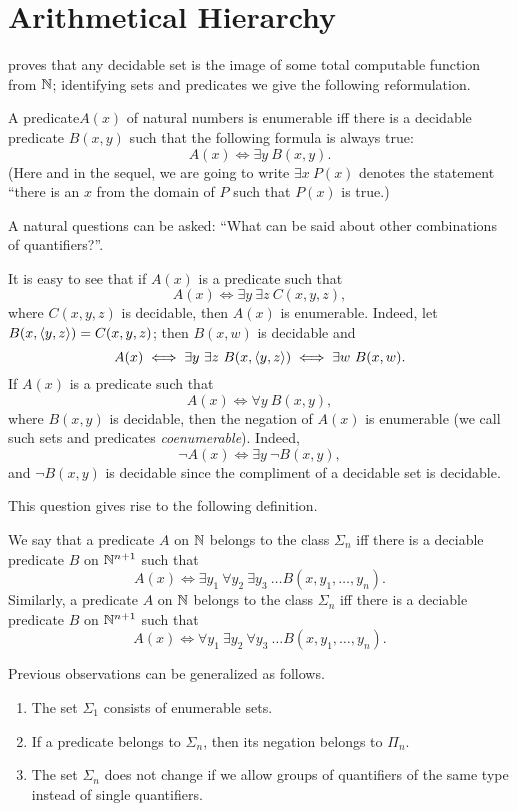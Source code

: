 \chapter{Arithmetical Hierarchy}

 proves that any decidable set
is the image of some total computable function from ${\mathbb{N}}$; identifying sets and
predicates we give the following reformulation.
\begin{theorem}
  A predicate$A(x)$ of natural numbers is enumerable iff there is a decidable
  predicate $B(x, y)$ such that the following formula is always true:
  \[
    A(x) \iff \exists y \  B(x, y).
  \]
  (Here and in the sequel, we are going to write $\exists x \  P(x)$ denotes the
  statement ``there is an $x$ from the domain of $P$ such that $P(x)$ is true.)
\end{theorem}

A natural questions can be asked: ``What can be said about other combinations of
quantifiers?''.

It is easy to see that if $A(x)$ is a predicate such that 
\[
  A(x) \iff \exists y \  \exists z \  C(x, y, z),
\]
where $C(x, y, z)$ is decidable, then $A(x)$ is enumerable.
Indeed, let $B(x, \langle {y}, {z} \rangle) = C(x, y, z)$; then $B(x, w)$ is decidable and 
\[
  A(x) \iff \exists y \  \exists z \  B(x, \langle {y}, {z} \rangle) \iff 
    \exists w \  B(x, w).
\]
If $A(x)$ is a predicate such that 
\[
  A(x) \iff \forall y \  B(x, y),
\]
where $B(x, y)$ is decidable, then the negation of $A(x)$ is enumerable (we call
such sets and predicates \emph{coenumerable}). Indeed, 
\[
  \lnot A(x) \iff \exists y \  \lnot B(x, y),
\]
and $\lnot B(x, y)$ is decidable since the compliment of a decidable set is
decidable.

This question gives rise to the following definition.
\begin{definition}
  We say that a predicate $A$ on ${\mathbb{N}}$ belongs to the class $\Sigma_n$ iff there
  is a deciable predicate $B$ on ${\mathbb{N}}^{n + 1}$ such that 
  \[
    A(x) \iff 
    \exists y_1 \  \forall y_2 \  \exists y_3 \  \dots B(x, y_1, \dots, y_n).
  \]
  Similarly, a predicate $A$ on ${\mathbb{N}}$ belongs to the class $\Sigma_n$ iff there
  is a deciable predicate $B$ on ${\mathbb{N}}^{n + 1}$ such that 
  \[
    A(x) \iff 
    \forall y_1 \  \exists y_2 \  \forall y_3 \  \dots B(x, y_1, \dots, y_n).
  \]
\end{definition}

Previous observations can be generalized as follows.
\begin{theorem}
\label{theorem:arythmetic-hierarchy-basics}
  \begin{enumerate}
    \item The set $\Sigma_1$ consists of enumerable sets.
    \item If a predicate belongs to $\Sigma_n$, then its negation belongs to
      $\Pi_n$.
    \item The set $\Sigma_n$ does not change if we allow groups of quantifiers
      of the same type instead of single quantifiers.
  \end{enumerate}
\end{theorem}


